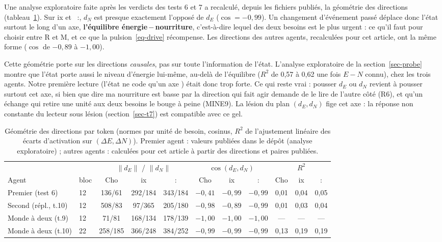 \documentclass[11pt,a4paper]{article}
\newcommand{\dE}{d_{E}}
\newcommand{\dN}{d_{N}}
\begin{document}
Une analyse exploratoire faite après les verdicts des tests 6 et 7 a recalculé,
depuis les fichiers publiés, la géométrie des directions (tableau~\ref{tab-axe}).
Sur \og ix \fg{} et \og\ :\fg{}, $\dN$ est presque exactement l'opposé de $\dE$
($\cos=-0,99$). Un changement d'événement passé déplace donc l'état surtout le long
d'un axe, \textbf{l'équilibre énergie\,$-$\,nourriture}, c'est-à-dire lequel des deux
besoins est le plus urgent : ce qu'il faut pour choisir entre R et M, et ce que la
pulsion~\eqref{eq-drive} récompense. Les directions des autres agents, recalculées
pour cet article, ont la même forme ($\cos$ de $-0,89$ à $-1,00$).

Cette géométrie porte sur les directions \emph{causales}, pas sur toute
l'information de l'état. L'analyse exploratoire de la section~\ref{sec-probe} montre
que l'état porte aussi le niveau d'énergie lui-même, au-delà de l'équilibre ($R^2$
de 0,57 à 0,62 une fois $E-N$ connu), chez les trois agents. Notre première lecture
(\og l'état ne code qu'un axe \fg{}) était donc trop forte. Ce qui reste vrai : pousser
$\dE$ ou $\dN$ revient à pousser surtout cet axe, si bien que dire \og ma nourriture
est basse \fg{} par la direction qui fait agir demande de le lire de l'autre côté
(R6), et qu'un échange qui retire une unité aux deux besoins le bouge à peine
(MINE9). La lésion du plan $(\dE,\dN)$ fige cet axe : la réponse \og non \fg{}
constante du lecteur sous lésion (section~\ref{sec-t7}) est compatible avec ce gel.

\begin{table}[t]
\centering
\caption{Géométrie des directions par token (normes par unité de besoin, cosinus,
$R^2$ de l'ajustement linéaire des écarts d'activation sur $(\Delta E,\Delta N)$).
Premier agent : valeurs publiées dans le dépôt (analyse exploratoire) ; autres
agents : calculées pour cet article à partir des directions et paires publiées.}
\label{tab-axe}
\small
\setlength{\tabcolsep}{4pt}
\begin{tabular}{@{}l l ccc ccc ccc@{}}
\toprule
& & \multicolumn{3}{c}{$\lVert\dE\rVert$ / $\lVert\dN\rVert$} & \multicolumn{3}{c}{$\cos(\dE,\dN)$} & \multicolumn{3}{c}{$R^2$} \\
\cmidrule(lr){3-5}\cmidrule(lr){6-8}\cmidrule(lr){9-11}
Agent & bloc & Cho & ix & : & Cho & ix & : & Cho & ix & : \\
\midrule
Premier (test 6) & 12 & 136/61 & 292/184 & 343/184 & $-0,41$ & $-0,99$ & $-0,99$ & 0,01 & 0,04 & 0,05 \\
Second (répl., t.10) & 12 & 508/83 & 97/365 & 205/180 & $-0,98$ & $-0,89$ & $-0,99$ & 0,01 & 0,03 & 0,04 \\
Monde à deux (t.9) & 12 & 71/81 & 168/134 & 178/139 & $-1,00$ & $-1,00$ & $-1,00$ & --- & --- & --- \\
Monde à deux (t.10) & 22 & 258/185 & 366/248 & 384/252 & $-0,99$ & $-0,99$ & $-0,99$ & 0,13 & 0,19 & 0,19 \\
\bottomrule
\end{tabular}
\end{table}
\end{document}
